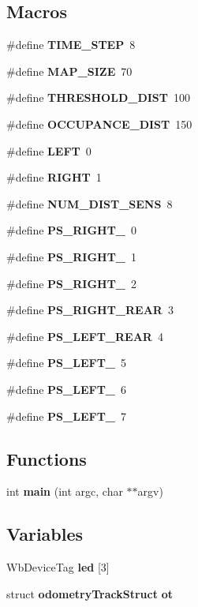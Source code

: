 \subsection*{Macros}
\begin{DoxyCompactItemize}
\item 
\#define {\bf T\-I\-M\-E\-\_\-\-S\-T\-E\-P}~8
\item 
\#define {\bf M\-A\-P\-\_\-\-S\-I\-Z\-E}~70
\item 
\#define {\bf T\-H\-R\-E\-S\-H\-O\-L\-D\-\_\-\-D\-I\-S\-T}~100
\item 
\#define {\bf O\-C\-C\-U\-P\-A\-N\-C\-E\-\_\-\-D\-I\-S\-T}~150
\item 
\#define {\bf L\-E\-F\-T}~0
\item 
\#define {\bf R\-I\-G\-H\-T}~1
\item 
\#define {\bf N\-U\-M\-\_\-\-D\-I\-S\-T\-\_\-\-S\-E\-N\-S}~8
\item 
\#define {\bf P\-S\-\_\-\-R\-I\-G\-H\-T\-\_}~0
\item 
\#define {\bf P\-S\-\_\-\-R\-I\-G\-H\-T\-\_}~1
\item 
\#define {\bf P\-S\-\_\-\-R\-I\-G\-H\-T\-\_}~2
\item 
\#define {\bf P\-S\-\_\-\-R\-I\-G\-H\-T\-\_\-\-R\-E\-A\-R}~3
\item 
\#define {\bf P\-S\-\_\-\-L\-E\-F\-T\-\_\-\-R\-E\-A\-R}~4
\item 
\#define {\bf P\-S\-\_\-\-L\-E\-F\-T\-\_}~5
\item 
\#define {\bf P\-S\-\_\-\-L\-E\-F\-T\-\_}~6
\item 
\#define {\bf P\-S\-\_\-\-L\-E\-F\-T\-\_}~7
\end{DoxyCompactItemize}
\subsection*{Functions}
\begin{DoxyCompactItemize}
\item 
int {\bf main} (int argc, char $\ast$$\ast$argv)
\end{DoxyCompactItemize}
\subsection*{Variables}
\begin{DoxyCompactItemize}
\item 
Wb\-Device\-Tag {\bf led} [3]
\item 
struct {\bf odometry\-Track\-Struct} {\bf ot}
\end{DoxyCompactItemize}


